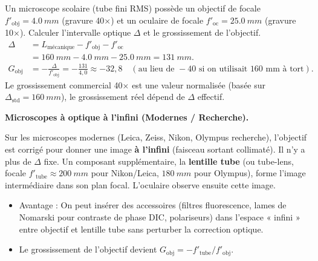 \documentclass[11pt]{article}
\begin{document}
\begin{exemplebox}
Un microscope scolaire (tube fini RMS) possède un objectif de focale $f'_{\text{obj}} = \SI{4,0}{mm}$ (gravure 40×) et un oculaire de focale $f'_{\text{oc}} = \SI{25,0}{mm}$ (gravure 10×).
Calculer l'intervalle optique $\Delta$ et le grossissement de l'objectif.
\begin{align*}
\Delta &= L_{\text{mécanique}} - f'_{\text{obj}} - f'_{\text{oc}} \\
       &= \SI{160}{mm} - \SI{4,0}{mm} - \SI{25,0}{mm} = \SI{131}{mm}. \\
G_{\text{obj}} &= -\frac{\Delta}{f'_{\text{obj}}} = -\frac{131}{4,0} \approx -32,8 \quad (\text{au lieu de } -40 \text{ si on utilisait } 160 \text{ mm à tort}).
\end{align*}
Le grossissement commercial 40× est une valeur normalisée (basée sur $\Delta_{\text{std}} = \SI{160}{mm}$), le grossissement réel dépend de $\Delta$ effectif.
\end{exemplebox}

\textbf{Microscopes à optique à l'infini (Modernes / Recherche).}\par
Sur les microscopes modernes (Leica, Zeiss, Nikon, Olympus recherche), l'objectif est corrigé pour donner une image \textbf{à l'infini} (faisceau sortant collimaté). Il n'y a plus de $\Delta$ fixe.
Un composant supplémentaire, la \textbf{lentille tube} (ou tube-lens, focale $f'_{\text{tube}} \approx \SI{200}{mm}$ pour Nikon/Leica, $\SI{180}{mm}$ pour Olympus), forme l'image intermédiaire dans son plan focal. L'oculaire observe ensuite cette image.
\begin{itemize}
    \item Avantage : On peut insérer des accessoires (filtres fluorescence, lames de Nomarski pour contraste de phase DIC, polariseurs) dans l'espace « infini » entre objectif et lentille tube sans perturber la correction optique.
    \item Le grossissement de l'objectif devient $G_{\text{obj}} = -f'_{\text{tube}} / f'_{\text{obj}}$.
\end{itemize}
\end{document}
